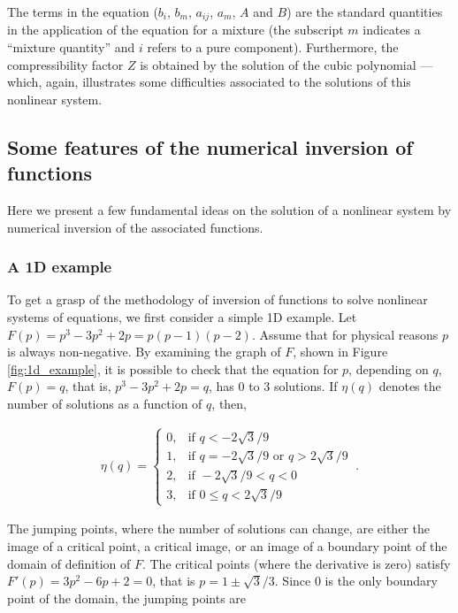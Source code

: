 \documentclass[journal=iecred,manuscript=article]{achemso}
\theoremstyle{definition}
\theoremstyle{remark}
\begin{document}
The terms in the equation ($b_i$, $b_m$, $a_{ij}$, $a_m$, $A$ and $B$) are the standard quantities in the application of the \citet{peng_robinson} equation for a mixture (the subscript $m$ indicates a ``mixture quantity'' and $i$ refers to a pure component). Furthermore, the compressibility factor $Z$ is obtained by the solution of the cubic polynomial --- which, again, illustrates some difficulties associated to the solutions of this nonlinear system.

\subsection{Some features of the numerical 
 inversion of 
functions}
Here we present a few fundamental ideas on the solution 
of a nonlinear system by numerical inversion of the
associated functions.
\subsubsection{A 1D example}
To get a grasp of the methodology of inversion of functions to 
solve nonlinear systems of equations, we first consider a 
simple 1D example.
Let $F(p)=p^3-3p^2+ 2p=p(p-1)(p-2)$. 
Assume that for physical reasons $p$ is always non-negative.
By examining the graph of $F$, shown in Figure \ref{fig:1d_example}, it is possible to 
check that the equation for $p$, depending on $q$, $F(p)=q$, that is, $p^3-3p^2+ 2p=q$,
has 0 to 3 solutions. If $\eta(q)$ denotes the 
number of solutions as a function of $q$, then, 
\begin{small}
\begin{eqnarray*}
\eta(q)= \left\{ 
\begin{array}{rl}
0 , & \text{if } q< -2\sqrt{3}/9\\
1, & \text{if } q= -2\sqrt{3}/9 \text{ or } q > 2\sqrt{3}/9\\
2 , & \text{if }  -2\sqrt{3}/9 < q  < 0 \\
3 , & \text{if } 0\leq q< 2\sqrt{3}/9
\end{array}\: .
\right.
\end{eqnarray*}
\end{small}
The jumping points, where 
 the number of solutions can change, are either the
 image of a critical point, a critical image,
 or an image of a boundary point of the domain of definition
 of $F$.
  The critical points
(where the derivative is zero) satisfy
$F'(p)=3p^2-6p+2 = 0$, that is $p=1 \pm \sqrt{3}/3$. Since 0 is the only boundary point of the domain,
 the jumping points are 
\end{document}
